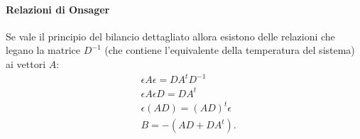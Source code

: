 \paragraph{Relazioni di Onsager}%
\label{par:Relazioni di Onsager}
Se vale il principio del bilancio dettagliato allora esistono delle relazioni che legano la matrice $D^{-1}$ (che contiene l'equivalente della temperatura del sistema) ai vettori $A$:
\begin{equation}
\begin{aligned}
    &\epsilon A\epsilon  = D A^tD^{-1} \\
    &\epsilon A\epsilon D = D A^t \\
    &\epsilon (AD) = (AD)^t\epsilon\\
    & B = -\left(AD + DA^t\right) \label{eq:11_B1}
.\end{aligned}
\end{equation}
